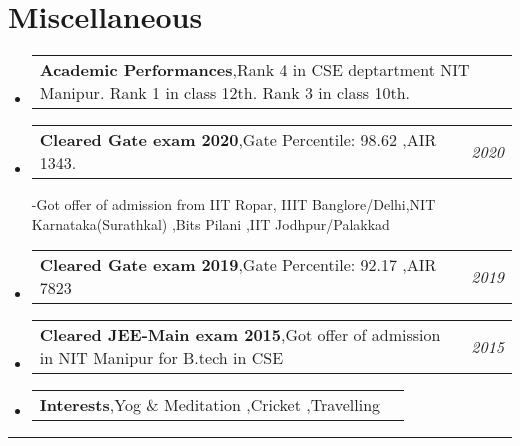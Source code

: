 \documentclass[a4paper,11pt]{article}
\makeatletter
\newcommand{\resumePOR}[3]{
\vspace{0.5mm}\item
    \begin{tabular*}{0.97\textwidth}[t]{l@{\extracolsep{\fill}}r}
        \textbf{#1},\hspace{0.3mm}#2 & \textit{\small{#3}} 
    \end{tabular*}
    \vspace{-2mm}
}
\newcommand{\resumeSubHeadingListStart}{\begin{itemize}[leftmargin=*,labelsep=0mm]}
\newcommand{\resumeSubHeadingListEnd}{\end{itemize}\vspace{2mm}}
\makeatother
\begin{document}
\section{\color{blue}\textbf{Miscellaneous}}
\vspace{-0.1mm}
\resumeSubHeadingListStart
\resumePOR{Academic Performances} %
    {Rank 4 in CSE deptartment NIT Manipur. Rank 1 in class 12th. Rank 3 in class 10th.} %
    {} %
\resumePOR{Cleared Gate exam 2020} %
    {Gate Percentile: 98.62 ,AIR 1343.} %
    {2020} %
    -Got offer of admission from IIT Ropar, IIIT Banglore/Delhi,NIT Karnataka(Surathkal) ,Bits Pilani ,IIT Jodhpur/Palakkad
\vspace{-0.1mm}
\resumePOR{Cleared Gate exam 2019} %
    {Gate Percentile: 92.17 ,AIR 7823} %
    {2019} %
\resumePOR{Cleared JEE-Main exam 2015} %
    {Got offer of admission in NIT Manipur for B.tech in CSE} %
    {2015} %
\resumePOR{Interests} %
    {Yog \& Meditation ,Cricket ,Travelling} %
    {} %

    
\vspace{-1.2mm}
\resumeSubHeadingListEnd
\hspace*{-5mm}\rule{1.035\textwidth}{0.1mm}


\end{document}
